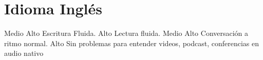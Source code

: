 \documentclass[draft,color,12pt,letterpaper,sans]{moderncv}
\begin{document}
\newpage

\section{Idioma Inglés}
{Medio Alto}
{Escritura Fluida.}
{Alto}
{Lectura fluida.}
{Medio Alto}
{Conversación a ritmo normal.}
{Alto}
{Sin problemas para entender videos, podcast, conferencias en audio nativo}

\end{document}
